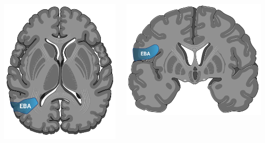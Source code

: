 \documentclass[a0paper,portrait,margin=0pt, colspace=24pt,subcolspace=0pt,blockverticalspace=36pt,innermargin=50pt]{tikzposter}
\begin{document}
\begin{columns}
{    \begin{minipage}{0.40\linewidth}
        \includegraphics[height=\linewidth]{Seminar Poster/Figures/EBA-activation-horizontal.png}
    \end{minipage}
    \begin{minipage}{0.40\linewidth}
        \includegraphics[height=\linewidth]{Seminar Poster/Figures/EBA-activation.png}            

\end{minipage}}
\end{columns}
\end{document}
